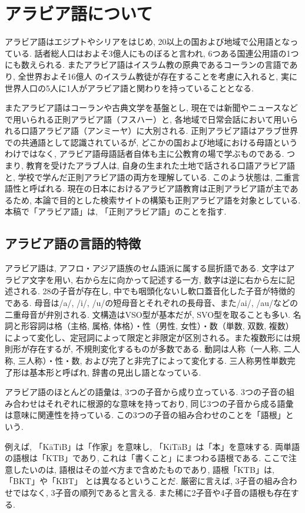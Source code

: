 \documentclass[technicalreport]{ieicej}
\begin{document}
\section{アラビア語について}
アラビア語はエジプトやシリアをはじめ, 20以上の国および地域で公用語となっている. 話者総人口はおよそ3億人にものぼると言われ, 6つある国連公用語の1つにも数えられる. またアラビア語はイスラム教の原典であるコーランの言語であり, 全世界およそ16億人 のイスラム教徒が存在することを考慮に入れると, 実に世界人口の5人に1人がアラビア語と関わりを持っていることとなる. 

またアラビア語はコーランや古典文学を基盤とし, 現在では新聞やニュースなどで用いられる正則アラビア語（フスハー）と, 各地域で日常会話において用いられる口語アラビア語（アンミーヤ）に大別される. 正則アラビア語はアラブ世界での共通語として認識されているが, どこかの国および地域における母語というわけではなく, アラビア語母語話者自体も主に公教育の場で学ぶものである. つまり, 教育を受けたアラブ人は, 自身の生まれた土地で話される口語アラビア語と, 学校で学んだ正則アラビア語の両方を理解している. このよう状態は, 二重言語性と呼ばれる. 現在の日本におけるアラビア語教育は正則アラビア語が主であるため, 本論で目的とした検索サイトの構築も正則アラビア語を対象としている. 本稿で「アラビア語」は, 「正則アラビア語」のことを指す. 

\subsection{アラビア語の言語的特徴}
アラビア語は, アフロ・アジア語族のセム語派に属する屈折語である. 文字はアラビア文字を用い, 右から左に向かって記述する一方, 数字は逆に右から左に記述される. 28の子音が存在し, 中でも咽頭化ないし軟口蓋音化した子音が特徴的である. 母音は/a/, /i/, /u/の短母音とそれぞれの長母音、また/ai/, /au/などの二重母音が弁別される. 文構造はVSO型が基本だが, SVO型を取ることも多い. 名詞と形容詞は格（主格, 属格, 体格）・性（男性, 女性）・数（単数, 双数, 複数）によって変化し、定冠詞によって限定と非限定が区別される。また複数形には規則形が存在するが, 不規則変化するものが多数である. 動詞は人称（一人称, 二人称, 三人称）・性・数, および完了と非完了によって変化する. 三人称男性単数完了形は基本形と呼ばれ, 辞書の見出し語となっている.

アラビア語のほとんどの語彙は, 3つの子音から成り立っている. 3つの子音の組み合わせはそれぞれに根源的な意味を持っており, 同じ3つの子音から成る語彙は意味に関連性を持っている. この3つの子音の組み合わせのことを「語根」という. 

例えば, 「KāTiB」は「作家」を意味し, 「KiTāB」は「本」を意味する. 両単語の語根は「KTB」であり, これは「書くこと」にまつわる語根である. ここで注意したいのは, 語根はその並べ方まで含めたものであり, 語根「KTB」は, 「BKT」や「KBT」 とは異なるということだ. 厳密に言えば, 3子音の組み合わせではなく, 3子音の順列であると言える. また稀に2子音や4子音の語根も存在する. 
\end{document}
